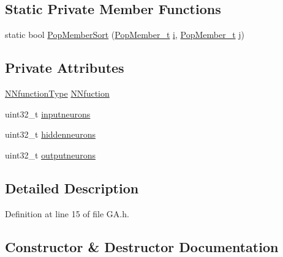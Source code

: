 \subsection*{Static Private Member Functions}
\begin{DoxyCompactItemize}
\item 
static bool \hyperlink{class_soil_math_1_1_g_a_a1e950022fa3ea792a36cbc62f9b8528b}{Pop\+Member\+Sort} (\hyperlink{_soil_math_types_8h_a7ded6c03705047ebe50207b22395dcd1}{Pop\+Member\+\_\+t} \hyperlink{_v_s_a___u_t_2_comparision_pictures_2_createtest_image_8m_a6f6ccfcf58b31cb6412107d9d5281426}{i}, \hyperlink{_soil_math_types_8h_a7ded6c03705047ebe50207b22395dcd1}{Pop\+Member\+\_\+t} \hyperlink{_v_s_a___u_t_2_comparision_pictures_2_createtest_image_8m_ac86694252f8dfdb19aaeadc4b7c342c6}{j})
\end{DoxyCompactItemize}
\subsection*{Private Attributes}
\begin{DoxyCompactItemize}
\item 
\hyperlink{_soil_math_types_8h_a7791f1b8f92a964847637c5d657c1b10}{N\+Nfunction\+Type} \hyperlink{class_soil_math_1_1_g_a_a9b690048c89c32e3153457378b5e1c31}{N\+Nfuction}
\item 
uint32\+\_\+t \hyperlink{class_soil_math_1_1_g_a_ac32591e30dde5ac854ae57a7b9e33298}{inputneurons}
\item 
uint32\+\_\+t \hyperlink{class_soil_math_1_1_g_a_a3f1eee7492f68a05b9b06ee8afb2ec20}{hiddenneurons}
\item 
uint32\+\_\+t \hyperlink{class_soil_math_1_1_g_a_ab454f9968d5ce2a294b89f85c9d3a74f}{outputneurons}
\end{DoxyCompactItemize}


\subsection{Detailed Description}


Definition at line 15 of file G\+A.\+h.



\subsection{Constructor \& Destructor Documentation}
\hypertarget{class_soil_math_1_1_g_a_a759b77fbe44fa1d5df5bcbdee9d97c4e}{}
